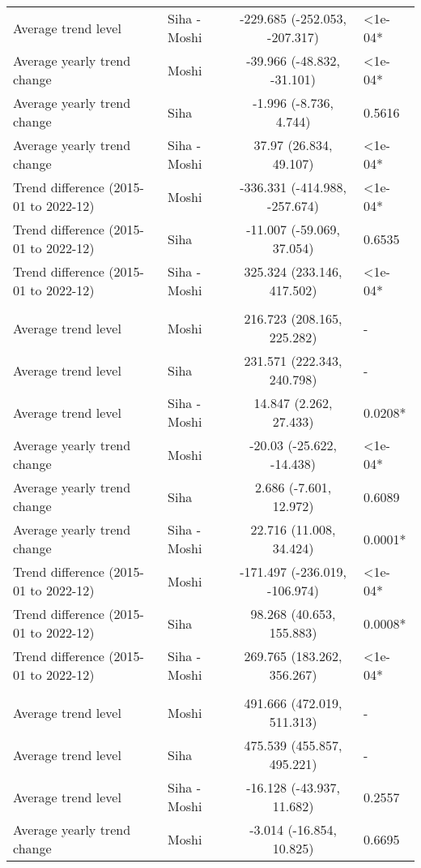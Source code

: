\begin{longtable}{l|lcl}
Average trend level & Siha - Moshi & -229.685 (-252.053, -207.317) & <1e-04* \\ 
Average yearly trend change & Moshi & -39.966 (-48.832, -31.101) & <1e-04* \\ 
Average yearly trend change & Siha & -1.996 (-8.736, 4.744) & 0.5616 \\ 
Average yearly trend change & Siha - Moshi & 37.97 (26.834, 49.107) & <1e-04* \\ 
Trend difference (2015-01 to 2022-12) & Moshi & -336.331 (-414.988, -257.674) & <1e-04* \\ 
Trend difference (2015-01 to 2022-12) & Siha & -11.007 (-59.069, 37.054) & 0.6535 \\ 
Trend difference (2015-01 to 2022-12) & Siha - Moshi & 325.324 (233.146, 417.502) & <1e-04* \\ 
\midrule\addlinespace[2.5pt]
\multicolumn{4}{l}{Other Communicable Diseases} \\[2.5pt] 
\midrule\addlinespace[2.5pt]
Average trend level & Moshi & 216.723 (208.165, 225.282) & - \\ 
Average trend level & Siha & 231.571 (222.343, 240.798) & - \\ 
Average trend level & Siha - Moshi & 14.847 (2.262, 27.433) & 0.0208* \\ 
Average yearly trend change & Moshi & -20.03 (-25.622, -14.438) & <1e-04* \\ 
Average yearly trend change & Siha & 2.686 (-7.601, 12.972) & 0.6089 \\ 
Average yearly trend change & Siha - Moshi & 22.716 (11.008, 34.424) & 0.0001* \\ 
Trend difference (2015-01 to 2022-12) & Moshi & -171.497 (-236.019, -106.974) & <1e-04* \\ 
Trend difference (2015-01 to 2022-12) & Siha & 98.268 (40.653, 155.883) & 0.0008* \\ 
Trend difference (2015-01 to 2022-12) & Siha - Moshi & 269.765 (183.262, 356.267) & <1e-04* \\ 
\midrule\addlinespace[2.5pt]
\multicolumn{4}{l}{Other Non-Communicable} \\[2.5pt] 
\midrule\addlinespace[2.5pt]
Average trend level & Moshi & 491.666 (472.019, 511.313) & - \\ 
Average trend level & Siha & 475.539 (455.857, 495.221) & - \\ 
Average trend level & Siha - Moshi & -16.128 (-43.937, 11.682) & 0.2557 \\ 
Average yearly trend change & Moshi & -3.014 (-16.854, 10.825) & 0.6695 \\ 

\end{longtable}
